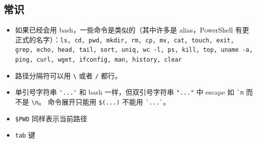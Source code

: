 
\subsection{常识}
\begin{itemize}
\item 如果已经会用 bash，一些命令是类似的（其中许多是 alias，PowerShell 有更正式的名字）：\verb`ls, cd, pwd, mkdir, rm, cp, mv, cat, touch, exit, grep, echo, head, tail, sort, uniq, wc -l, ps, kill, top, uname -a, ping, curl, wget, ifconfig, man, history, clear`
\item 路径分隔符可以用 \verb`\` 或者 \verb`/` 都行。
\item 单引号字符串 \verb`'...'` 和 bash 一样，但双引号字符串 \verb`"..."` 中 escape 如 \verb|`n| 而不是 \verb`\n`。 命令展开只能用 \verb`$(...)` 不能用 \verb|`...`|。
\item \verb`$PWD` 同样表示当前路径
\item \verb`tab` 键
\end{itemize}

